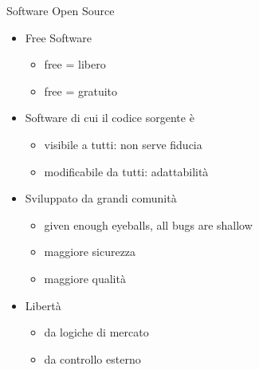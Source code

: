 \begin{frame}{Software Open Source}
  \vfill
  \begin{itemize}
    \item \alert{Free} Software
    \begin{itemize}
      \item free = libero
      \item free = gratuito
    \end{itemize}
    \vfill
    \item Software di cui il codice sorgente è
    \begin{itemize}
      \item visibile a tutti: non serve fiducia
      \item modificabile da tutti: adattabilità
    \end{itemize}
    \vfill
    \item Sviluppato da grandi comunità
    \begin{itemize}
      \item given enough eyeballs, all bugs are shallow
      \item maggiore sicurezza
      \item maggiore qualità
    \end{itemize}
    \vfill
    \item Libertà
    \begin{itemize}
      \item da logiche di mercato
      \item da controllo esterno
    \end{itemize}
  \end{itemize}
  \vfill
\end{frame}
